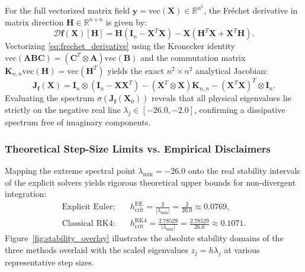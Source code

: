 \documentclass[11pt,a4paper]{article}
\theoremstyle{definition}
\theoremstyle{remark}
\begin{document}
For the full vectorized matrix field $\mathbf{y} = \mathrm{vec}(\mathbf{X}) \in \mathbb{R}^{n^2}$, the Fr\'echet derivative in matrix direction $\mathbf{H} \in \mathbb{R}^{n \times n}$ is given by:
\begin{equation}
\label{eq:frechet_derivative}
\mathcal{D}\mathbf{f}(\mathbf{X})[\mathbf{H}] = \mathbf{H}\left(\mathbf{I}_n - \mathbf{X}^T \mathbf{X}\right) - \mathbf{X}\left(\mathbf{H}^T \mathbf{X} + \mathbf{X}^T \mathbf{H}\right).
\end{equation}
Vectorizing \eqref{eq:frechet_derivative} using the Kronecker identity $\mathrm{vec}(\mathbf{A}\mathbf{B}\mathbf{C}) = (\mathbf{C}^T \otimes \mathbf{A})\mathrm{vec}(\mathbf{B})$ and the commutation matrix $\mathbf{K}_{n,n}\mathrm{vec}(\mathbf{H}) = \mathrm{vec}(\mathbf{H}^T)$ yields the exact $n^2 \times n^2$ analytical Jacobian:
\begin{equation}
\label{eq:analytic_jacobian_kron}
\mathbf{J}_{\mathbf{f}}(\mathbf{X}) = \mathbf{I}_n \otimes \left(\mathbf{I}_n - \mathbf{X}\mathbf{X}^T\right) - \left(\mathbf{X}^T \otimes \mathbf{X}\right)\mathbf{K}_{n,n} - \left(\mathbf{X}^T \mathbf{X}\right)^T \otimes \mathbf{I}_n.
\end{equation}
Evaluating the spectrum $\sigma(\mathbf{J}_{\mathbf{f}}(\mathbf{X}_0))$ reveals that all physical eigenvalues lie strictly on the negative real line $\lambda_j \in [-26.0, -2.0]$, confirming a dissipative spectrum free of imaginary components.

\subsubsection{Theoretical Step-Size Limits vs. Empirical Disclaimers}
Mapping the extreme spectral point $\lambda_{\min} = -26.0$ onto the real stability intervals of the explicit solvers yields rigorous theoretical upper bounds for non-divergent integration:
\begin{align}
\text{Explicit Euler:} \quad & h_{\mathrm{crit}}^{\mathrm{EE}} = \frac{2}{|\lambda_{\min}|} = \frac{2}{26.0} \approx 0.0769, \label{eq:hcrit_EE_calc} \\
\text{Classical RK4:} \quad & h_{\mathrm{crit}}^{\mathrm{RK4}} = \frac{2.78529}{|\lambda_{\min}|} = \frac{2.78529}{26.0} \approx 0.1071. \label{eq:hcrit_RK4_calc}
\end{align}
Figure~\ref{fig:stability_overlay} illustrates the absolute stability domains of the three methods overlaid with the scaled eigenvalues $z_j = h\lambda_j$ at various representative step sizes.
\end{document}
